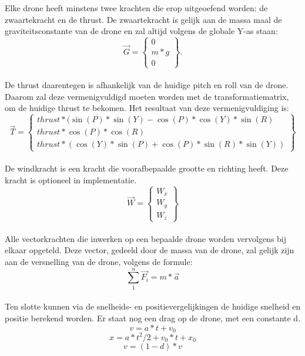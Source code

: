 \\
\\
Elke drone heeft minstens twee krachten die erop uitgeoefend worden: de zwaartekracht en de thrust. De zwaartekracht is gelijk aan de massa maal de graviteitsconstante van de drone en zal altijd volgens de globale Y-as staan: \\
\begin{equation*} 
\vec{G} =
\begin{Bmatrix}
0 \\
m * g \\
0 
\end{Bmatrix}.
\end{equation*} 
\\
De thrust daarentegen is afhankelijk van de huidige pitch en roll van de drone. Daarom zal deze vermenigvuldigd moeten worden met de transformatiematrix, om de huidige thrust te bekomen. Het resultaat van deze vermenigvuldiging is: 
\begin{equation*} 
\vec{T} = 
\begin{Bmatrix}
thrust*(\sin(P)*\sin(Y) - \cos(P)*\cos(Y)*\sin(R)\\ 
thrust*\cos(P)*\cos(R) \\
thrust*(\cos(Y)*\sin(P) + \cos(P)*\sin(R)*\sin(Y))
\end{Bmatrix}
\end{equation*}
\\
De windkracht is een kracht die voorafbepaalde grootte en richting heeft. Deze kracht is optioneel in implementatie. \\
\begin{equation*}
\vec{W} = 
\begin{Bmatrix}
W_x \\
W_y \\
W_z 
\end{Bmatrix}
\end{equation*}
\\
Alle vectorkrachten die inwerken op een bepaalde drone worden vervolgens bij elkaar opgeteld. Deze vector, gedeeld door de massa van de drone, zal gelijk zijn aan de versnelling van de drone, volgens de formule: \\
\begin{equation*}
	\sum_{1}^{n} \vec{F_i} = m * \vec{a} 
\end{equation*}
\\
Ten slotte kunnen via de snelheids- en positievergelijkingen de huidige snelheid en positie berekend worden. Er staat nog een drag op de drone, met een constante d. \\
\begin{equation*}
v = a*t + v_0
\end{equation*} 
\begin{equation*}
x = a*t^{2}/2 + v_0*t + x_0
\end{equation*}
\begin{equation*}
v = (1-d) * v
\end{equation*}


